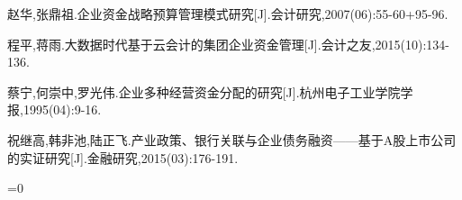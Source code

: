 \documentclass{article}
\begin{document}
\fi
\clearpage
{}
\begin{thebibliography}{}
	\bibitem{}赵华,张鼎祖.企业资金战略预算管理模式研究[J].会计研究,2007(06):55-60+95-96.\par
	\bibitem{}程平,蒋雨.大数据时代基于云会计的集团企业资金管理[J].会计之友,2015(10):134-136.\par
	\bibitem{}蔡宁,何崇中,罗光伟.企业多种经营资金分配的研究[J].杭州电子工业学院学报,1995(04):9-16.\par
	\bibitem{}祝继高,韩非池,陆正飞.产业政策、银行关联与企业债务融资——基于A股上市公司的实证研究[J].金融研究,2015(03):176-191.\par
\end{thebibliography}
\ifnum{}=0
	
\end{document}
